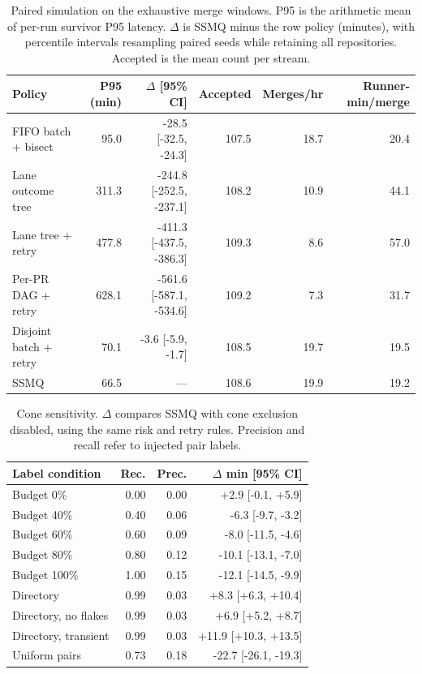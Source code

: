 \begin{table}[t]\centering\small
\caption{Paired simulation on the exhaustive merge windows. P95 is the arithmetic mean of per-run survivor P95 latency. $\Delta$ is SSMQ minus the row policy (minutes), with percentile intervals resampling paired seeds while retaining all repositories. Accepted is the mean count per stream.}\label{tab:v6sim}
\begin{tabular}{lrrrrr}\toprule Policy & P95 (min) & $\Delta$ [95\% CI] & Accepted & Merges/hr & Runner-min/merge \\ \midrule
FIFO batch + bisect & 95.0 & -28.5 [-32.5, -24.3] & 107.5 & 18.7 & 20.4 \\
Lane outcome tree & 311.3 & -244.8 [-252.5, -237.1] & 108.2 & 10.9 & 44.1 \\
Lane tree + retry & 477.8 & -411.3 [-437.5, -386.3] & 109.3 & 8.6 & 57.0 \\
Per-PR DAG + retry & 628.1 & -561.6 [-587.1, -534.6] & 109.2 & 7.3 & 31.7 \\
Disjoint batch + retry & 70.1 & -3.6 [-5.9, -1.7] & 108.5 & 19.7 & 19.5 \\
SSMQ & 66.5 & --- & 108.6 & 19.9 & 19.2 \\
\bottomrule\end{tabular}\end{table}
\begin{table}[t]\centering\scriptsize
\caption{Cone sensitivity. $\Delta$ compares SSMQ with cone exclusion disabled, using the same risk and retry rules. Precision and recall refer to injected pair labels.}\label{tab:v6control}
\begin{tabular}{lrrr}\toprule Label condition & Rec. & Prec. & $\Delta$ min [95\% CI] \\ \midrule
Budget 0\% & 0.00 & 0.00 & +2.9 [-0.1, +5.9] \\
Budget 40\% & 0.40 & 0.06 & -6.3 [-9.7, -3.2] \\
Budget 60\% & 0.60 & 0.09 & -8.0 [-11.5, -4.6] \\
Budget 80\% & 0.80 & 0.12 & -10.1 [-13.1, -7.0] \\
Budget 100\% & 1.00 & 0.15 & -12.1 [-14.5, -9.9] \\
Directory & 0.99 & 0.03 & +8.3 [+6.3, +10.4] \\
Directory, no flakes & 0.99 & 0.03 & +6.9 [+5.2, +8.7] \\
Directory, transient & 0.99 & 0.03 & +11.9 [+10.3, +13.5] \\
Uniform pairs & 0.73 & 0.18 & -22.7 [-26.1, -19.3] \\
\bottomrule\end{tabular}\end{table}

